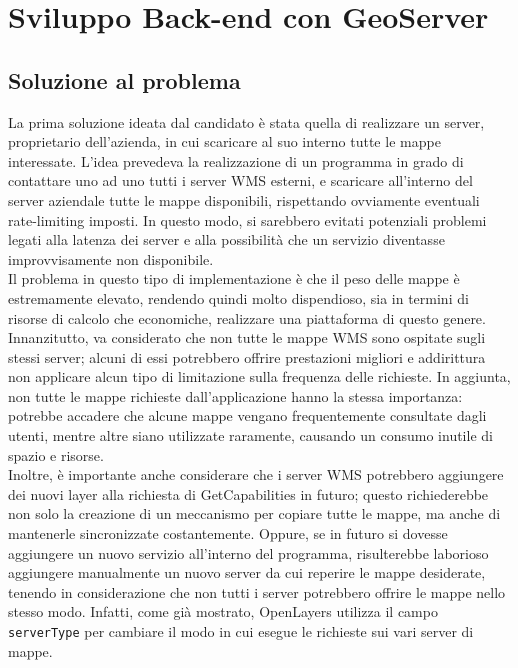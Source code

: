 \chapter{Sviluppo Back-end con GeoServer}
\label{cap:chapter5}

\section{Soluzione al problema}

La prima soluzione ideata dal candidato è stata quella di realizzare un server, proprietario dell'azienda, in cui scaricare al suo interno tutte le mappe interessate. L'idea prevedeva la realizzazione di un programma in grado di contattare uno ad uno tutti i server WMS esterni, e scaricare all'interno del server aziendale tutte le mappe disponibili, rispettando ovviamente eventuali rate-limiting imposti. In questo modo, si sarebbero evitati potenziali problemi legati alla latenza dei server e alla possibilità che un servizio diventasse improvvisamente non disponibile.
\\Il problema in questo tipo di implementazione è che il peso delle mappe è estremamente elevato, rendendo quindi molto dispendioso, sia in termini di risorse di calcolo che economiche, realizzare una piattaforma di questo genere. 
\\Innanzitutto, va considerato che non tutte le mappe WMS sono ospitate sugli stessi server; alcuni di essi potrebbero offrire prestazioni migliori e addirittura non applicare alcun tipo di limitazione sulla frequenza delle richieste. In aggiunta, non tutte le mappe richieste dall'applicazione hanno la stessa importanza: potrebbe accadere che alcune mappe vengano frequentemente consultate dagli utenti, mentre altre siano utilizzate raramente, causando un consumo inutile di spazio e risorse. 
\\Inoltre, è importante anche considerare che i server WMS potrebbero aggiungere dei nuovi layer alla richiesta di GetCapabilities in futuro; questo richiederebbe non solo la creazione di un meccanismo per copiare tutte le mappe, ma anche di mantenerle sincronizzate costantemente. Oppure, se in futuro si dovesse aggiungere un nuovo servizio all'interno del programma, risulterebbe laborioso aggiungere manualmente un nuovo server da cui reperire le mappe desiderate, tenendo in considerazione che non tutti i server potrebbero offrire le mappe nello stesso modo. Infatti, come già mostrato, OpenLayers utilizza il campo \verb|serverType| per cambiare il modo in cui esegue le richieste sui vari server di mappe.
